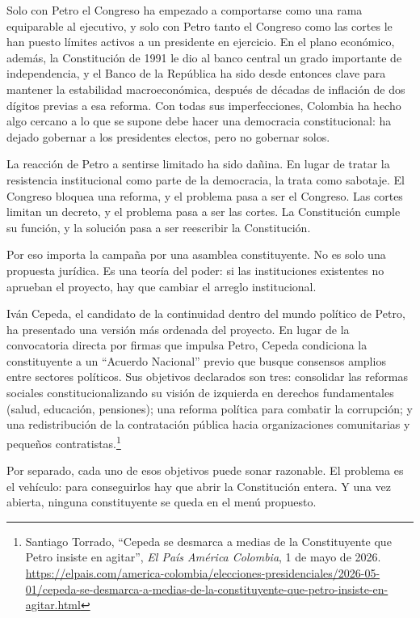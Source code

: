 \documentclass[11pt,letterpaper]{article}
\begin{document}
Solo con Petro el Congreso ha empezado a comportarse como una rama equiparable al ejecutivo, y solo con Petro tanto el Congreso como las cortes le han puesto límites activos a un presidente en ejercicio. En el plano económico, además, la Constitución de 1991 le dio al banco central un grado importante de independencia, y el Banco de la República ha sido desde entonces clave para mantener la estabilidad macroeconómica, después de décadas de inflación de dos dígitos previas a esa reforma. Con todas sus imperfecciones, Colombia ha hecho algo cercano a lo que se supone debe hacer una democracia constitucional: ha dejado gobernar a los presidentes electos, pero no gobernar solos.

La reacción de Petro a sentirse limitado ha sido dañina. En lugar de tratar la resistencia institucional como parte de la democracia, la trata como sabotaje. El Congreso bloquea una reforma, y el problema pasa a ser el Congreso. Las cortes limitan un decreto, y el problema pasa a ser las cortes. La Constitución cumple su función, y la solución pasa a ser reescribir la Constitución.

Por eso importa la campaña por una asamblea constituyente. No es solo una propuesta jurídica. Es una teoría del poder: si las instituciones existentes no aprueban el proyecto, hay que cambiar el arreglo institucional.

Iván Cepeda, el candidato de la continuidad dentro del mundo político de Petro, ha presentado una versión más ordenada del proyecto. En lugar de la convocatoria directa por firmas que impulsa Petro, Cepeda condiciona la constituyente a un ``Acuerdo Nacional'' previo que busque consensos amplios entre sectores políticos. Sus objetivos declarados son tres: consolidar las reformas sociales constitucionalizando su visión de izquierda en derechos fundamentales (salud, educación, pensiones); una reforma política para combatir la corrupción; y una redistribución de la contratación pública hacia organizaciones comunitarias y pequeños contratistas.\footnote{Santiago Torrado, ``Cepeda se desmarca a medias de la Constituyente que Petro insiste en agitar'', \textit{El País América Colombia}, 1 de mayo de 2026. \url{https://elpais.com/america-colombia/elecciones-presidenciales/2026-05-01/cepeda-se-desmarca-a-medias-de-la-constituyente-que-petro-insiste-en-agitar.html}}

Por separado, cada uno de esos objetivos puede sonar razonable. El problema es el vehículo: para conseguirlos hay que abrir la Constitución entera. Y una vez abierta, ninguna constituyente se queda en el menú propuesto.
\end{document}
